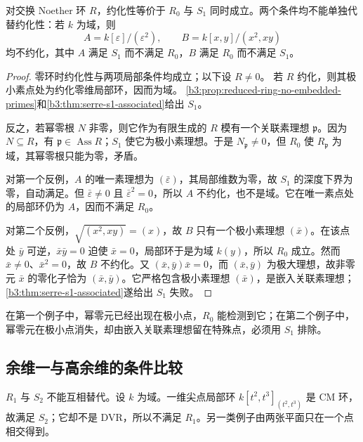 \begin{proposition}\label{b3:prop:reduced-serre-criterion}
	对交换 Noether 环 \(R\)，约化性等价于 \(R_0\) 与 \(S_1\) 同时成立。两个条件均不能单独代替约化性：若 \(k\) 为域，则
	\[
		A=k[\varepsilon]/(\varepsilon^2),\qquad B=k[x,y]/(x^2,xy)
	\]
	均不约化，其中 \(A\) 满足 \(S_1\) 而不满足 \(R_0\)，\(B\) 满足 \(R_0\) 而不满足 \(S_1\)。
\end{proposition}
\begin{proof}
	零环时约化性与两项局部条件均成立；以下设 \(R\ne0\)。 若 \(R\) 约化，则其极小素点处为约化零维局部环，因而为域。 \cref{b3:prop:reduced-ring-no-embedded-primes}和\cref{b3:thm:serre-s1-associated}给出 \(S_1\)。

	反之，若幂零根 \(N\) 非零，则它作为有限生成的 \(R\) 模有一个关联素理想 \(\mathfrak p\)。因为 \(N\subseteq R\)，有 \(\mathfrak p\in\operatorname{Ass}R\)；\(S_1\) 使它为极小素理想。于是 \(N_{\mathfrak p}\ne0\)，但 \(R_0\) 使 \(R_{\mathfrak p}\) 为域，其幂零根只能为零，矛盾。

	对第一个反例，\(A\) 的唯一素理想为 \((\bar\varepsilon)\)，其局部维数为零，故 \(S_1\) 的深度下界为零，自动满足。但 \(\bar\varepsilon\ne0\) 且 \(\bar\varepsilon^2=0\)，所以 \(A\) 不约化，也不是域。它在唯一素点处的局部环仍为 \(A\)，因而不满足 \(R_0\)。

	对第二个反例，\(\sqrt{(x^2,xy)}=(x)\)，故 \(B\) 只有一个极小素理想 \((\bar x)\)。在该点处 \(\bar y\) 可逆，\(\bar x\bar y=0\) 迫使 \(\bar x=0\)，局部环于是为域 \(k(y)\)，所以 \(R_0\) 成立。然而 \(\bar x\ne0\)、\(\bar x^2=0\)，故 \(B\) 不约化。又 \((\bar x,\bar y)\bar x=0\)，而 \((\bar x,\bar y)\) 为极大理想，故非零元 \(\bar x\) 的零化子恰为 \((\bar x,\bar y)\)。它严格包含极小素理想 \((\bar x)\)，是嵌入关联素理想；\cref{b3:thm:serre-s1-associated}遂给出 \(S_1\) 失败。
\end{proof}

在第一个例子中，幂零元已经出现在极小点，\(R_0\) 能检测到它；在第二个例子中，幂零元在极小点消失，却由嵌入关联素理想留在特殊点，必须用 \(S_1\) 排除。

\subsection{余维一与高余维的条件比较}
\label{b3:subsec:2001:03}

\(R_1\) 与 \(S_2\) 不能互相替代。设 \(k\) 为域。一维尖点局部环 \(k[t^2,t^3]_{(t^2,t^3)}\) 是 CM 环，故满足 \(S_2\)；它却不是 DVR，所以不满足 \(R_1\)。另一类例子由两张平面只在一个点相交得到。

